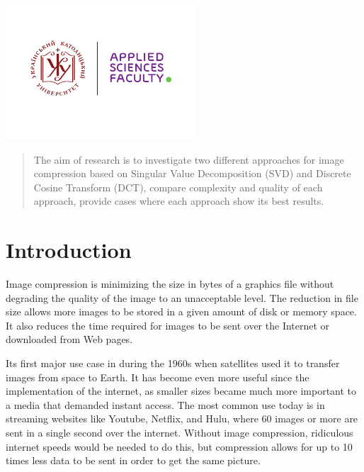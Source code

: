 \begin{titlepage}

\includegraphics[height=5cm]{UCU-Apps.png}\\[1cm] %
 

\vfill %

\end{titlepage}

\begin{abstract}
The aim of research is to investigate two different approaches for image compression based on Singular Value Decomposition (SVD) and Discrete Cosine Transform (DCT), compare complexity and quality of each approach, provide cases where each approach show its best results.
\end{abstract}

\section{Introduction}

Image compression is minimizing the size in bytes of a graphics file without degrading the quality of the image to an unacceptable level. The reduction in file size allows more images to be stored in a given amount of disk or memory space. It also reduces the time required for images to be sent over the Internet or downloaded from Web pages. 

Its first major use case in during the 1960s when satellites used it to transfer images from space to Earth.  It has become even more useful since the implementation of the internet, as smaller sizes
became much more important to a media that demanded instant access. The most common use
today is in streaming websites like Youtube, Netflix, and Hulu, where 60 images or more are
sent in a single second over the internet. Without image compression, ridiculous internet speeds
would be needed to do this, but compression allows for up to 10 times less data to be sent in
order to get the same picture.

